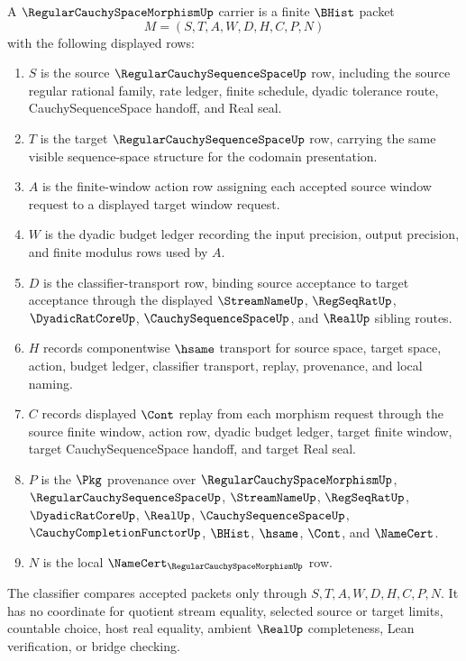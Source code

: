 \begin{definition}
\label{def:regular-cauchy-space-morphism-carrier}
A $\RegularCauchySpaceMorphismUp$ carrier is a finite $\BHist$ packet
$$
M=(S,T,A,W,D,H,C,P,N)
$$
with the following displayed rows:
\begin{enumerate}
\item $S$ is the source $\RegularCauchySequenceSpaceUp$ row, including the source regular rational family, rate ledger, finite schedule, dyadic tolerance route, CauchySequenceSpace handoff, and Real seal.
\item $T$ is the target $\RegularCauchySequenceSpaceUp$ row, carrying the same visible sequence-space structure for the codomain presentation.
\item $A$ is the finite-window action row assigning each accepted source window request to a displayed target window request.
\item $W$ is the dyadic budget ledger recording the input precision, output precision, and finite modulus rows used by $A$.
\item $D$ is the classifier-transport row, binding source acceptance to target acceptance through the displayed $\StreamNameUp$, $\RegSeqRatUp$, $\DyadicRatCoreUp$, $\CauchySequenceSpaceUp$, and $\RealUp$ sibling routes.
\item $H$ records componentwise $\hsame$ transport for source space, target space, action, budget ledger, classifier transport, replay, provenance, and local naming.
\item $C$ records displayed $\Cont$ replay from each morphism request through the source finite window, action row, dyadic budget ledger, target finite window, target CauchySequenceSpace handoff, and target Real seal.
\item $P$ is the $\Pkg$ provenance over $\RegularCauchySpaceMorphismUp$, $\RegularCauchySequenceSpaceUp$, $\StreamNameUp$, $\RegSeqRatUp$, $\DyadicRatCoreUp$, $\RealUp$, $\CauchySequenceSpaceUp$, $\CauchyCompletionFunctorUp$, $\BHist$, $\hsame$, $\Cont$, and $\NameCert$.
\item $N$ is the local $\NameCert_{\RegularCauchySpaceMorphismUp}$ row.
\end{enumerate}
The classifier compares accepted packets only through $S,T,A,W,D,H,C,P,N$. It has no coordinate for quotient stream equality, selected source or target limits, countable choice, host real equality, ambient $\RealUp$ completeness, Lean verification, or bridge checking.
\end{definition}

